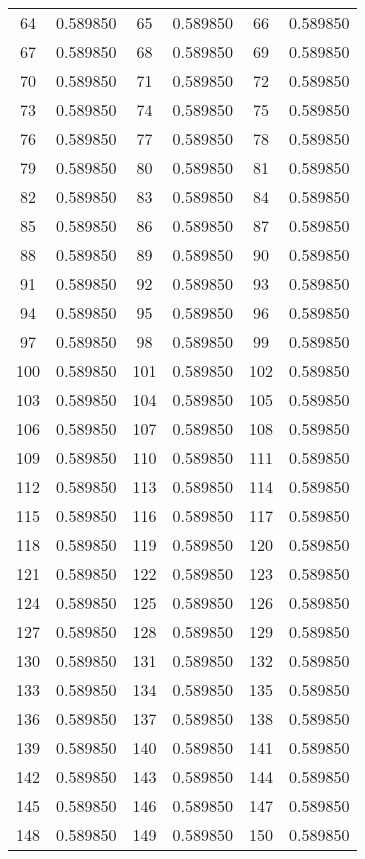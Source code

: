 \documentclass[12pt]{article}
\begin{document}
\begin{longtable}{@{}cc|cc|cc@{}}
64 & 0.589850 & 65 & 0.589850 & 66 & 0.589850 \\
67 & 0.589850 & 68 & 0.589850 & 69 & 0.589850 \\
70 & 0.589850 & 71 & 0.589850 & 72 & 0.589850 \\
73 & 0.589850 & 74 & 0.589850 & 75 & 0.589850 \\
76 & 0.589850 & 77 & 0.589850 & 78 & 0.589850 \\
79 & 0.589850 & 80 & 0.589850 & 81 & 0.589850 \\
82 & 0.589850 & 83 & 0.589850 & 84 & 0.589850 \\
85 & 0.589850 & 86 & 0.589850 & 87 & 0.589850 \\
88 & 0.589850 & 89 & 0.589850 & 90 & 0.589850 \\
91 & 0.589850 & 92 & 0.589850 & 93 & 0.589850 \\
94 & 0.589850 & 95 & 0.589850 & 96 & 0.589850 \\
97 & 0.589850 & 98 & 0.589850 & 99 & 0.589850 \\
100 & 0.589850 & 101 & 0.589850 & 102 & 0.589850 \\
103 & 0.589850 & 104 & 0.589850 & 105 & 0.589850 \\
106 & 0.589850 & 107 & 0.589850 & 108 & 0.589850 \\
109 & 0.589850 & 110 & 0.589850 & 111 & 0.589850 \\
112 & 0.589850 & 113 & 0.589850 & 114 & 0.589850 \\
115 & 0.589850 & 116 & 0.589850 & 117 & 0.589850 \\
118 & 0.589850 & 119 & 0.589850 & 120 & 0.589850 \\
121 & 0.589850 & 122 & 0.589850 & 123 & 0.589850 \\
124 & 0.589850 & 125 & 0.589850 & 126 & 0.589850 \\
127 & 0.589850 & 128 & 0.589850 & 129 & 0.589850 \\
130 & 0.589850 & 131 & 0.589850 & 132 & 0.589850 \\
133 & 0.589850 & 134 & 0.589850 & 135 & 0.589850 \\
136 & 0.589850 & 137 & 0.589850 & 138 & 0.589850 \\
139 & 0.589850 & 140 & 0.589850 & 141 & 0.589850 \\
142 & 0.589850 & 143 & 0.589850 & 144 & 0.589850 \\
145 & 0.589850 & 146 & 0.589850 & 147 & 0.589850 \\
148 & 0.589850 & 149 & 0.589850 & 150 & 0.589850 \\

\end{longtable}
\end{document}
